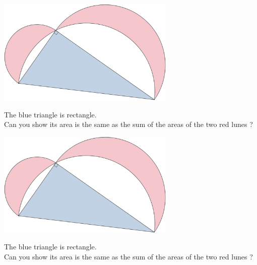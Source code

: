 \documentclass[12pt,a4paper,article,english,firamath]{nsi}
\begin{document}
\maketitle
\begin{center}
    \includegraphics[width=8.5cm]{img/lunes.png}
\end{center}
The blue triangle is rectangle.\\
Can you show its area is the same as the sum of the areas of the two red lunes ?\\[13em]

\maketitle
\begin{center}
    \includegraphics[width=8.5cm]{img/lunes.png}
\end{center}
The blue triangle is rectangle.\\
Can you show its area is the same as the sum of the areas of the two red lunes ?
\end{document}
